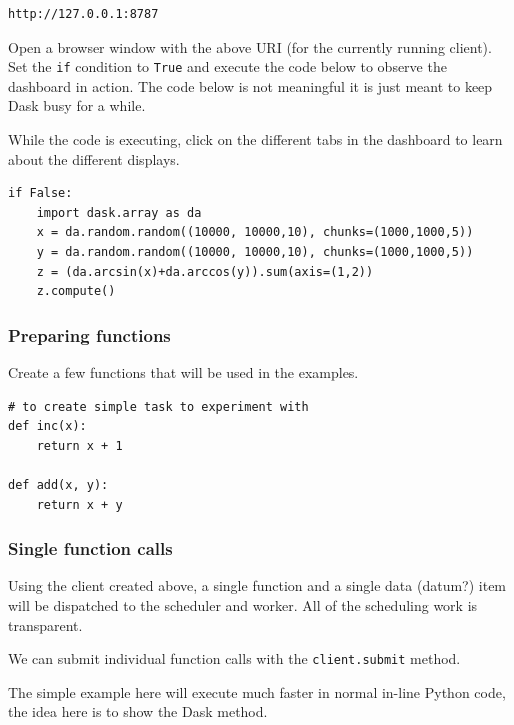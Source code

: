 \begin{lstlisting}[style=outcellstyle]
http://127.0.0.1:8787

\end{lstlisting}

Open a browser window with the above \ac{URI} (for the currently running client). Set the \verb+if+ condition to \verb+True+ and execute the code below to observe the dashboard in action.
The code below is not meaningful it is just meant to keep Dask busy for a while.


While the code is executing, click on the different tabs in the dashboard to learn about the different displays.



\begin{lstlisting}[style=incellstyle]
if False:
    import dask.array as da
    x = da.random.random((10000, 10000,10), chunks=(1000,1000,5))
    y = da.random.random((10000, 10000,10), chunks=(1000,1000,5))
    z = (da.arcsin(x)+da.arccos(y)).sum(axis=(1,2))
    z.compute()
\end{lstlisting}


\subsubsection{Preparing functions}
\label{sec:Preparingfunctions}

Create a few functions that will be used in the examples.



\begin{lstlisting}[style=incellstyle]
# to create simple task to experiment with
def inc(x):
    return x + 1

def add(x, y):
    return x + y

\end{lstlisting}


\subsubsection{Single function calls}
\label{sec:Singlefunctioncalls}

Using the client created above, a single function and a single data (datum?) item will be dispatched to the scheduler and worker. All of the scheduling work is transparent.


We can submit individual function calls with the \verb+client.submit+ method.


The simple example here will execute much faster in normal in-line Python code, the idea here is to show the Dask method.



